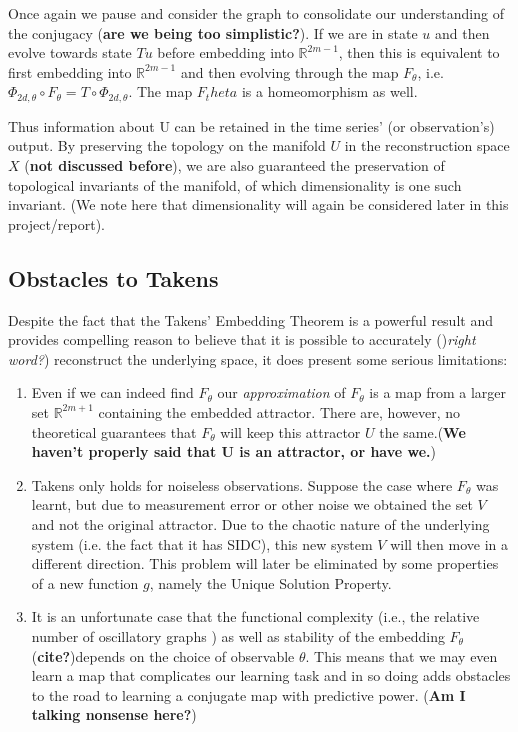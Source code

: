 \documentclass[12 pt]{article}
\newcommand{\Ftheta}{\ensuremath{F_\theta}}
\begin{document}
Once again we pause and consider the graph to consolidate our understanding of the conjugacy (\textbf{are we being too simplistic?}). If we are in state $u$ and then evolve towards state $Tu$ before embedding into $\mathbb{R}^{2m-1}$, then this is equivalent to first embedding into $\mathbb{R}^{2m-1}$ and then evolving through the map $\Ftheta$, i.e. $\Phi_{2d,\theta}\circ{F}_{\theta} = T\circ\Phi_{2d,\theta}$. The map $F_theta$ is a homeomorphism as well. 

Thus information about U can be retained in the time series' (or observation's) output. By preserving the topology on the manifold $U$ in the reconstruction space $X$ (\textbf{not discussed before}), we are also guaranteed the preservation of topological invariants of the manifold, of which dimensionality is one such invariant. (We note here that dimensionality will again be considered later in this project/report).

\subsection{Obstacles to Takens}
Despite the fact that the Takens' Embedding Theorem is a powerful result and provides compelling reason to believe that it is possible to accurately ()\emph{right word?}) reconstruct the underlying space, it does present some serious limitations:
\vspace{-5mm}
\begin{enumerate}
\item Even if we can indeed find \Ftheta{}  our \emph{approximation} of \Ftheta{}  is a map from a larger set $\mathbb{R}^{2m+1}$ containing the embedded attractor. There are, however, no theoretical guarantees that \Ftheta{}  will keep this attractor $U$  the same.(\textbf{We haven't properly said that U is an attractor, or have we.})
\item Takens only holds for noiseless observations. Suppose the case where \Ftheta{} was learnt, but due to measurement error or other noise we obtained the set $V$ and not the original attractor. Due to the chaotic nature of the underlying system (i.e. the fact that it has SIDC), this new system $V$ will then move in a different direction. This problem will later be eliminated by some properties of a new function $g$, namely the Unique Solution Property. 
\item It is an unfortunate case that the functional complexity (i.e., the relative number of oscillatory graphs \cite{manjunath2021universal}) as well as stability of the embedding \Ftheta{} (\textbf{cite?})depends on the choice of observable $\theta$. This means that we may even learn a map that complicates our learning task and in so doing adds obstacles to the road to learning a conjugate map with predictive power. (\textbf{Am I talking nonsense here?})
\end{enumerate}
\end{document}
